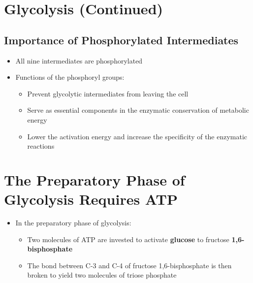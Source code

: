 \documentclass[10pt]{article}
\begin{document}
\section*{Glycolysis (Continued)}
\subsection*{Importance of Phosphorylated Intermediates}
\begin{itemize}
	\item All nine intermediates are phosphorylated
	\item Functions of the phosphoryl groups:
	\begin{itemize}
        \item Prevent glycolytic intermediates from leaving the cell
        \item Serve as essential components in the enzymatic conservation of metabolic energy
        \item Lower the activation energy and increase the specificity of the enzymatic reactions
    \end{itemize}
\end{itemize}

\section*{The Preparatory Phase of Glycolysis Requires ATP}
\begin{itemize}
	\item In the preparatory phase of glycolysis:
	\begin{itemize}
        \item Two molecules of ATP are invested to activate \textbf{glucose} to fructose \textbf{1,6-bisphosphate}
        \item The bond between C-3 and C-4 of fructose 1,6-bisphosphate is then broken to yield two molecules of triose phosphate
    \end{itemize}
\end{itemize}
\end{document}
